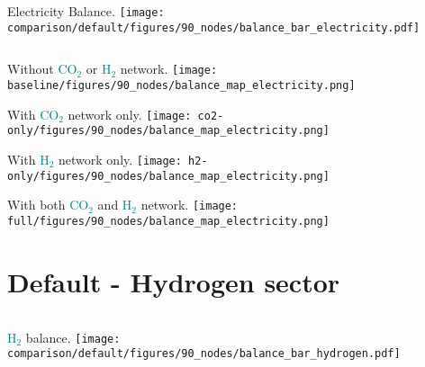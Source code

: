 \documentclass[12pt, aspectratio=169]{beamer}
\newcommand{\carbon}{\textcolor{teal}{CO$_2$}}
\newcommand{\hydrogen}{\textcolor{teal}{H$_2$}}
\begin{document}
\begin{frame}
    \begin{columns}
        Electricity Balance.
        \texttt{[image: comparison/default/figures/90\_nodes/balance\_bar\_electricity.pdf]}
    \end{columns}
\end{frame}

\begin{frame}
    \begin{center}
    Without \carbon{} or \hydrogen{} network.
    \texttt{[image: baseline/figures/90\_nodes/balance\_map\_electricity.png]}
    \end{center}
\end{frame}


\begin{frame}
    \begin{center}
    With \carbon{} network only.
    \texttt{[image: co2-only/figures/90\_nodes/balance\_map\_electricity.png]}
    \end{center}
\end{frame}

\begin{frame}
    \begin{center}
    With \hydrogen{} network only.
    \texttt{[image: h2-only/figures/90\_nodes/balance\_map\_electricity.png]}
    \end{center}
\end{frame}

\begin{frame}
    \begin{center}
    With both \carbon{}  and \hydrogen{} network.
    \texttt{[image: full/figures/90\_nodes/balance\_map\_electricity.png]}
    \end{center}
\end{frame}

\section*{Default - Hydrogen sector}

\begin{frame}
    \begin{columns}
        \hydrogen{} balance.
        \texttt{[image: comparison/default/figures/90\_nodes/balance\_bar\_hydrogen.pdf]}
    \end{columns}
\end{frame}
\end{document}
